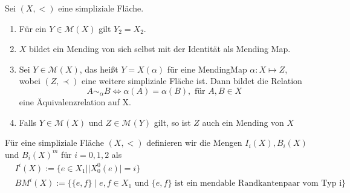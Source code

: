 \documentclass[12pt,titlepage]{article}
\begin{document}
  \begin{bemerkung}
  Sei $(X,<)$ eine simpliziale Fläche.
  \begin{enumerate}
  \item Für ein $Y \in \mathcal{M}(X)$ gilt $Y_2=X_2$.
  \item $X$ bildet ein Mending von sich selbst mit der Identität als Mending Map.
  \item Sei $Y\in \mathcal{M}(X)$, das heißt $Y=X(\alpha)$ für eine MendingMap $\alpha:X \mapsto Z$, wobei $(Z,\prec)$ eine weitere simpliziale Fläche ist. Dann bildet die Relation 
  \[
A\sim_\alpha B \Leftrightarrow \alpha(A)=\alpha(B),\text{ für }A,B \in X
  \]
  eine Äquivalenzrelation auf X.
  \item Falls $Y\in \mathcal{M}(X)$ und $Z \in \mathcal{M}(Y)$ gilt, so ist $Z$ auch ein Mending von $X$
  \end{enumerate}
  \end{bemerkung}
  
  \begin{definition}
  Für eine simpliziale Fläche $(X,<)$ definieren wir die Mengen $I_{i}(X),B_{i}(X)$ und $B_{i}(X)^m$ für $i=0,1,2$ als
  \begin{align*}
  &I^i(X):=\{e \in X_1 \mid \vert X_{0}^{0}(e)\vert=i\}\\
  &BM^{i}(X):=\{\{e,f\} \mid e,f \in X_1 \text{ und }\{e,f\}\text{ ist ein mendable Randkantenpaar vom Typ i}\}\\
  \end{align*}
  \end{definition}
  
  
  \newpage
\end{document}
